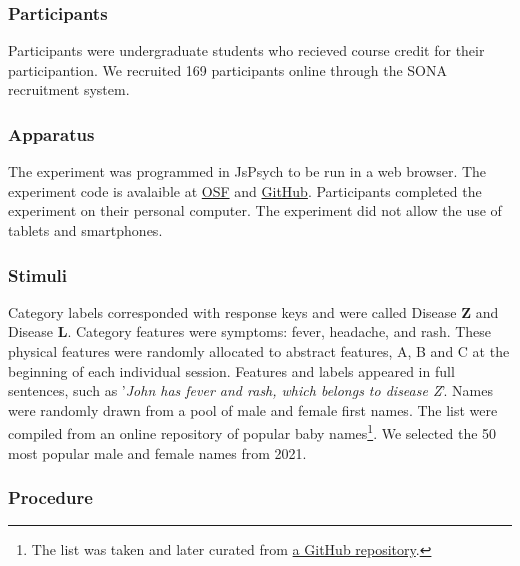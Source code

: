 \documentclass[10pt,letterpaper]{article}
\begin{document}
\subsubsection*{Participants}

Participants were undergraduate students who recieved course credit for their participantion.
We recruited 169 participants online through the SONA recruitment system.


\subsubsection*{Apparatus}

The experiment was programmed in JsPsych \cite{deleeuw2015JsPsych} to be run in a web browser.
The experiment code is avalaible at \href{https://osf.io/auwvt/?view_only=2dc8384074fa4bcf9f2e3937fdaee2b4}{OSF} and \href{https://github.com/lenarddome/ply216-observational-ibre}{GitHub}.
Participants completed the experiment on their personal computer.
The experiment did not allow the use of tablets and smartphones.

\subsubsection*{Stimuli}

Category labels corresponded with response keys and were called Disease \textbf{Z} and Disease \textbf{L}.
Category features were symptoms: fever, headache, and rash.
These physical features were randomly allocated to abstract features, A, B and C at the beginning of each individual session.
Features and labels appeared in full sentences, such as '\textit{John has fever and rash, which belongs to disease Z}'.
Names were randomly drawn from a pool of male and female first names.
The list were compiled from an online repository of popular baby names\footnote[1]{The list was taken and later curated from \href{https://github.com/aruljohn/popular-baby-names}{a GitHub repository}.}.
We selected the 50 most popular male and female names from 2021.

\subsubsection*{Procedure}
\end{document}
